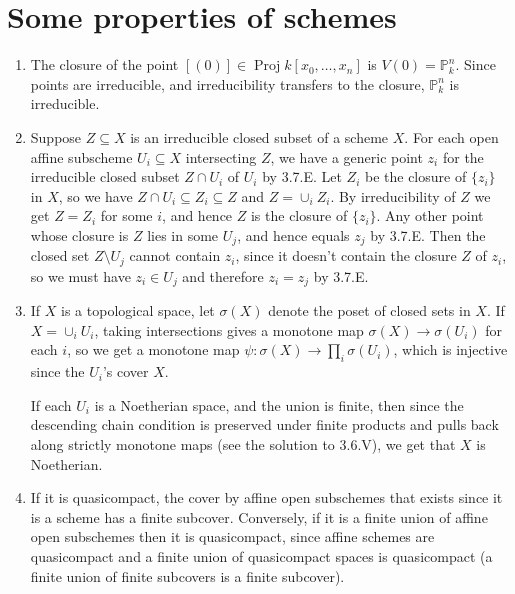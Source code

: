 \documentclass{report}
\renewcommand{\P}{\mathbb{P}} %
\DeclareMathOperator{\Proj}{Proj}
\begin{document}
\chapter{Some properties of schemes}

\begin{enumerate}[label=\textbf{5.1.\Alph*.}]
	\item The closure of the point $[(0)]\in\Proj k[x_0,\ldots,x_n]$ is
	      $V(0)=\P^n_k$. Since points are irreducible, and irreducibility
	      transfers to the closure, $\P^n_k$ is irreducible.

	\item Suppose $Z\subseteq X$ is an irreducible closed subset of a scheme
	      $X$. For each open affine subscheme $U_i\subseteq X$ intersecting $Z$,
	      we have a generic point $z_i$ for the irreducible closed subset
	      $Z\cap U_i$ of $U_i$ by 3.7.E. Let $Z_i$ be the closure of $\{z_i\}$
	      in $X$, so we have $Z\cap U_i\subseteq Z_i\subseteq Z$ and
	      $Z=\cup_iZ_i$. By irreducibility of $Z$ we get $Z=Z_i$ for some $i$,
	      and hence $Z$ is the closure of $\{z_i\}$. Any other point whose
	      closure is $Z$ lies in some $U_j$, and hence equals $z_j$ by 3.7.E.
	      Then the closed set $Z\setminus U_j$ cannot contain $z_i$, since it
	      doesn't contain the closure $Z$ of $z_i$, so we must
	      have $z_i\in U_j$ and therefore $z_i=z_j$ by 3.7.E.

	\item If $X$ is a topological space, let $\sigma(X)$ denote the poset of
	      closed sets in $X$. If $X=\cup_iU_i$, taking intersections gives a
	      monotone map $\sigma(X)\to\sigma(U_i)$ for each $i$, so we get a
	      monotone map $\psi:\sigma(X)\to\prod_i\sigma(U_i)$, which is injective
	      since the $U_i$'s cover $X$.

	      If each $U_i$ is a Noetherian space, and the union is finite, then since
	      the descending chain condition is preserved under finite products and
	      pulls back along strictly monotone maps (see the solution to 3.6.V), we
	      get that $X$ is Noetherian.

	\item If it is quasicompact, the cover by affine open subschemes that exists
	      since it is a scheme has a finite subcover. Conversely, if it is a
	      finite union of affine open subschemes then it is quasicompact, since
	      affine schemes are quasicompact and a finite union of quasicompact
	      spaces is quasicompact (a finite union of finite subcovers is a finite
	      subcover).


\end{enumerate}
\end{document}
